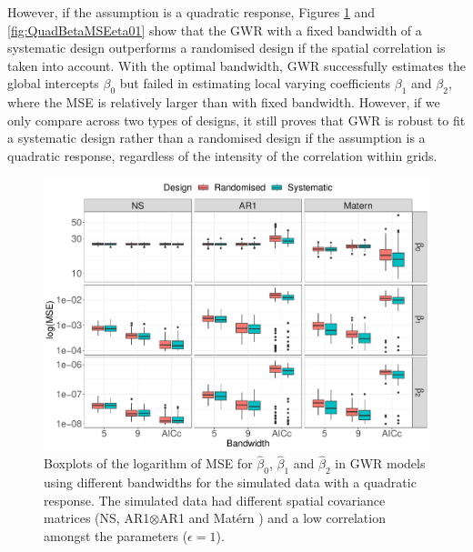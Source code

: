 \documentclass[a4paper]{article} 	%
\newcommand{\Matern}{Mat\'ern }
\begin{document}
However, if the assumption is a quadratic response, Figures \ref{fig:QuadBetaMSE} and \ref{fig:QuadBetaMSEeta01} show that the GWR with a fixed bandwidth of a systematic design outperforms a randomised design if the spatial correlation is taken into account. With the optimal bandwidth, GWR successfully estimates the global intercepts $\beta_0$ but failed in estimating local varying coefficients $\beta_1$ and $\beta_2$, where the MSE is relatively larger than with fixed bandwidth. However, if we only compare across two types of designs, it still proves that GWR is robust to fit a systematic design rather than a randomised design if the assumption is a quadratic response, regardless of the intensity of the correlation within grids. 

\begin{figure}[!thp]
	\centering
	\includegraphics[width=\linewidth]{Expt/Col_QuaCombMSE_newpar.pdf}
	\caption{Boxplots of the logarithm of MSE for $\hat{\beta}_0$, $\hat{\beta}_1$ and $\hat{\beta}_2$ in GWR models using different bandwidths for the simulated data with a quadratic response. The simulated data had different spatial covariance matrices (NS, AR1$\otimes$AR1 and \Matern) and a low correlation amongst the parameters ($\epsilon=1$).} \label{fig:QuadBetaMSE}
\end{figure}


\end{document}
